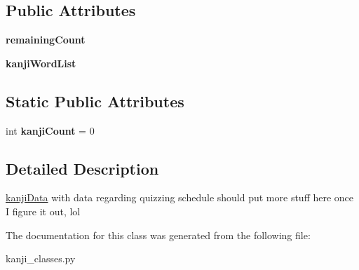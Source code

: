 \subsection*{Public Attributes}
\begin{DoxyCompactItemize}
\item 
\mbox{\label{classkanji__classes_1_1kanji_data_a7959a22360108a7a5ce95f803d88624f}} 
{\bfseries remaining\+Count}
\item 
\mbox{\label{classkanji__classes_1_1kanji_data_a6cf8e04492350b4b5674809a9f68bdc1}} 
{\bfseries kanji\+Word\+List}
\end{DoxyCompactItemize}
\subsection*{Static Public Attributes}
\begin{DoxyCompactItemize}
\item 
\mbox{\label{classkanji__classes_1_1kanji_data_a4741746cef77fae299a095891ee61bda}} 
int {\bfseries kanji\+Count} = 0
\end{DoxyCompactItemize}


\subsection{Detailed Description}
\mbox{\hyperlink{classkanji__classes_1_1kanji_data}{kanji\+Data}} with data regarding quizzing schedule should put more stuff here once I figure it out, lol 

The documentation for this class was generated from the following file\+:\begin{DoxyCompactItemize}
\item 
kanji\+\_\+classes.\+py\end{DoxyCompactItemize}
